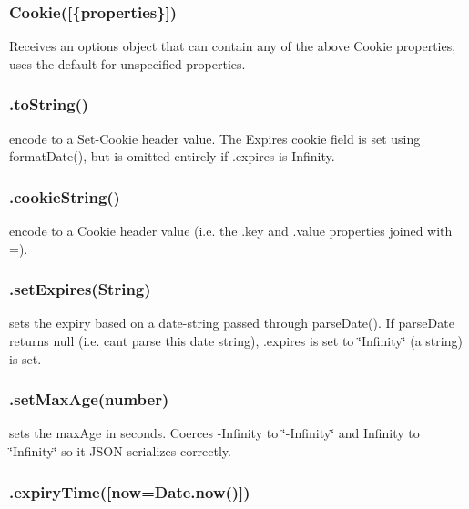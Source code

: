 \subsubsection*{{\ttfamily Cookie(\mbox{[}\{properties\}\mbox{]})}}

Receives an options object that can contain any of the above Cookie properties, uses the default for unspecified properties.

\subsubsection*{{\ttfamily .to\+String()}}

encode to a Set-\/\+Cookie header value. The Expires cookie field is set using {\ttfamily format\+Date()}, but is omitted entirely if {\ttfamily .expires} is {\ttfamily Infinity}.

\subsubsection*{{\ttfamily .cookie\+String()}}

encode to a Cookie header value (i.\+e. the {\ttfamily .key} and {\ttfamily .value} properties joined with \textquotesingle{}=\textquotesingle{}).

\subsubsection*{{\ttfamily .set\+Expires(\+String)}}

sets the expiry based on a date-\/string passed through {\ttfamily parse\+Date()}. If parse\+Date returns {\ttfamily null} (i.\+e. can\textquotesingle{}t parse this date string), {\ttfamily .expires} is set to {\ttfamily \char`\"{}\+Infinity\char`\"{}} (a string) is set.

\subsubsection*{{\ttfamily .set\+Max\+Age(number)}}

sets the max\+Age in seconds. Coerces {\ttfamily -\/\+Infinity} to {\ttfamily \char`\"{}-\/\+Infinity\char`\"{}} and {\ttfamily Infinity} to {\ttfamily \char`\"{}\+Infinity\char`\"{}} so it J\+S\+O\+N serializes correctly.

\subsubsection*{{\ttfamily .expiry\+Time(\mbox{[}now=Date.\+now()\mbox{]})}}

